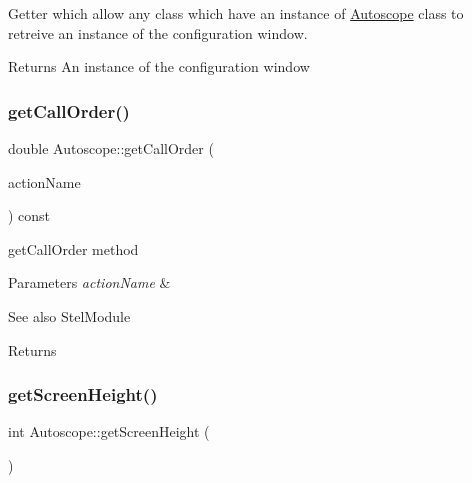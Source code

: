 Getter which allow any class which have an instance of \mbox{\hyperlink{class_autoscope}{Autoscope}} class to retreive an instance of the configuration window. 

\begin{DoxyReturn}{Returns}
An instance of the configuration window 
\end{DoxyReturn}
\mbox{\label{class_autoscope_a9495317b6b710812825c40dbe7ddd458}} 
\subsubsection{\texorpdfstring{getCallOrder()}{getCallOrder()}}
{\footnotesize\ttfamily double Autoscope\+::get\+Call\+Order (\begin{DoxyParamCaption}\item[{Stel\+Module\+Action\+Name}]{action\+Name }\end{DoxyParamCaption}) const\hspace{0.3cm}{\ttfamily [virtual]}}



get\+Call\+Order method 


\begin{DoxyParams}{Parameters}
{\em action\+Name} & \\
\hline
\end{DoxyParams}
\begin{DoxySeeAlso}{See also}
Stel\+Module 
\end{DoxySeeAlso}
\begin{DoxyReturn}{Returns}

\end{DoxyReturn}
\mbox{\label{class_autoscope_adb579d1e5a23aaa401d5a93be033529d}} 
\subsubsection{\texorpdfstring{getScreenHeight()}{getScreenHeight()}}
{\footnotesize\ttfamily int Autoscope\+::get\+Screen\+Height (\begin{DoxyParamCaption}\item[{void}]{ }\end{DoxyParamCaption})\hspace{0.3cm}{\ttfamily [inline]}}



